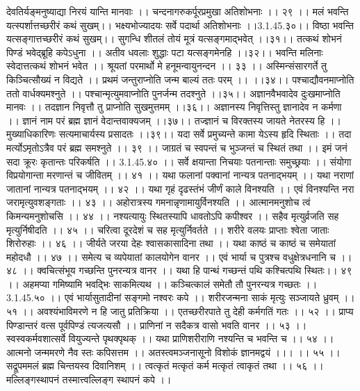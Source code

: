 देवतिर्यङ्मनुष्याद्या निरयं यान्ति मानवाः ।।
चन्दनागरुकर्पूरप्रमुखा अतिशोभनाः ।। २९ ।।
मलं भवन्ति यत्स्पर्शात्तच्छरीरं कथं सुखम्।।
भक्ष्यभोज्यादयः सर्वे पदार्था अतिशोभनाः ।।3.1.45.३०।।
विष्ठा भवन्ति यत्सङ्गात्तच्छरीरं कथं सुखम्।।
सुगन्धि शीतलं तोयं मूत्रं यत्सङ्गमाद्भवेत् ।।३१।।
तत्कथं शोभनं पिण्डं भवेद्ब्रूहि कपेऽधुना ।।
अतीव धवलाः शुद्धाः पटा यत्सङ्गमेनहि ।।३२।।
भवन्ति मलिनाः स्वेदात्तत्कथं शोभनं भवेत ।।
श्रूयतां परमार्थो मे हनूमन्वायुनन्दन ।। ३३ ।।
अस्मिन्संसारगर्ते तु किञ्चित्सौख्यं न विद्यते ।।
प्रथमं जन्तुराप्नोति जन्म बाल्यं ततः परम् ।। ।।३४।।
पश्चाद्यौवनमाप्नोति ततो वार्धक्यमश्नुते ।।
पश्चान्मृत्युमवाप्नोति पुनर्जन्म तदश्नुते ।।३५।।
अज्ञानवैभवादेव दुःखमाप्नोति मानवः ।।
तदज्ञान निवृत्तौ तु प्राप्नोति सुखमुत्तमम् ।।३६।।
अज्ञानस्य निवृत्तिस्तु ज्ञानादेव न कर्मणा ।।
ज्ञानं नाम परं ब्रह्म ज्ञानं वेदान्तवाक्यजम् ।।३७।।
तज्ज्ञानं च विरक्तस्य जायते नेतरस्य हि ।।
मुख्याधिकारिणः सत्यमाचार्यस्य प्रसादतः ।।३९।।
यदा सर्वे प्रमुच्यन्ते कामा येऽस्य हृदि स्थिताः ।।
तदा मर्त्योऽमृतोऽत्रैव परं ब्रह्म समश्नुते ।। ३९ ।।
जाग्रतं च स्वपन्तं च भुञ्जन्तं च स्थितं तथा ।।
इमं जनं सदा क्रूरः कृतान्तः परिकर्षति ।। 3.1.45.४० ।।
सर्वे क्षयान्ता निचयाः पतनान्ताः समुच्छ्रयाः ।।
संयोगा विप्रयोगान्ता मरणान्तं च जीवितम् ।। ४१ ।।
यथा फलानां पक्वानां नान्यत्र पतनाद्भयम् ।।
यथा नराणां जातानां नान्यत्र पतनाद्भयम् ।। ४२ ।।
यथा गृहं दृढस्तंभं जीर्णं काले विनश्यति ।।
एवं विनश्यन्ति नरा जरामृत्युवशङ्गताः ।। ४३ ।।
अहोरात्रस्य गमनान्नृणामायुर्विनश्यति ।।
आत्मानमनुशोच त्वं किमन्यमनुशोचसि ।। ४४ ।।
नश्यत्यायुः स्थितस्यापि धावतोऽपि कपीश्वर ।।
सहैव मृत्युर्व्रजति सह मृत्युर्निषीदति ।। ४५ ।।
चरित्वा दूरदेशं च सह मृत्युर्निवर्तते ।।
शरीरे वलयः प्राप्ताः श्वेता जाताः शिरोरुहाः ।। ४६ ।।
जीर्यते जरया देहः श्वासकासादिना तथा ।।
यथा काष्ठं च काष्ठं च समेयातां महोदधौ ।। ४७ ।।
समेत्य च व्यपेयातां कालयोगेन वानर ।।
एवं भार्या च पुत्रश्च वधुक्षेत्रधनानि च ।। ४८ ।।
क्वचित्संभूय गच्छन्ति पुनरन्यत्र वानर ।।
यथा हि पान्थं गच्छन्तं पथि कश्चित्पथि स्थितः।। ४९ ।।
अहमप्या गमिष्यामि भवद्भिः साकमित्यथ ।।
कञ्चित्कालं समेतौ तौ पुनरन्यत्र गच्छतः ।। 3.1.45.५० ।।
एवं भार्यासुतादीनां सङ्गमो नश्वरः कपे ।।
शरीरजन्मना साकं मृत्युः सञ्जायते ध्रुवम् ।। ५१ ।।
अवश्यंभाविमरणे न हि जातु प्रतिक्रिया ।।
एतच्छरीरपाते तु देही कर्मगतिं गतः ।। ५२ ।।
प्राप्य पिण्डान्तरं वत्स पूर्वपिण्डं त्यजत्यसौ ।।
प्राणिनां न सदैकत्र वासो भवति वानर ।। ५३ ।।
स्वस्वकर्मवशात्सर्वे वियुज्यन्ते पृथक्पृथक् ।।
यथा प्राणिशरीराणि नश्यन्ति च भवन्ति च ।। ५४ ।।
आत्मनो जन्ममरणे नैव स्तः कपिसत्तम ।।
अतस्त्वमञ्जनासूनो विशोकं ज्ञानमद्वयं ।।। ।। ५५ ।।
सद्रूपममलं ब्रह्म चिन्तयस्व दिवानिशम् ।।
त्वत्कृतं मत्कृतं कर्म मत्कृतं त्वाकृतं तथा ।। ५६ ।।
मल्लिङ्गस्थापनं तस्मात्त्वल्लिङ्ग स्थापनं कपे ।।

